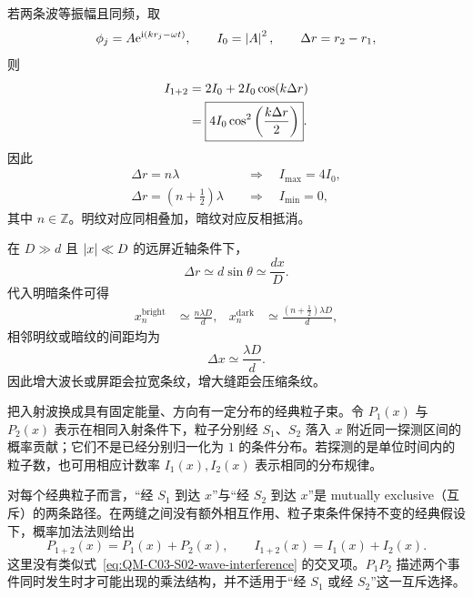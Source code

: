 若两条波等振幅且同频，取
\begin{equation}
  \phi_j=A\mathrm{e}^{\mathrm{i}(kr_j-\omega t)},
  \qquad
  I_0=\left|A\right|^2,
  \qquad
  \Delta r=r_2-r_1,
  \label{eq:QM-C03-S02-equal-amplitude-waves}
\end{equation}
则
\begin{align}
  I_{1+2}
  &=2I_0+2I_0\cos(k\Delta r) \notag\\
  &=\boxed{4I_0\cos^2\left(\frac{k\Delta r}{2}\right)}.
  \label{eq:QM-C03-S02-interference-intensity}
\end{align}
因此
\begin{align}
  \Delta r=n\lambda
  &\quad\Longrightarrow\quad
  I_{\max}=4I_0,
  \label{eq:QM-C03-S02-bright-condition}\\
  \Delta r=\left(n+\frac12\right)\lambda
  &\quad\Longrightarrow\quad
  I_{\min}=0,
  \label{eq:QM-C03-S02-dark-condition}
\end{align}
其中 $n\in\mathbb Z$。明纹对应同相叠加，暗纹对应反相抵消。

在 $D\gg d$ 且 $\left|x\right|\ll D$ 的远屏近轴条件下，
\begin{equation}
  \Delta r\simeq d\sin\theta\simeq\frac{dx}{D}.
  \label{eq:QM-C03-S02-path-difference-approximation}
\end{equation}
代入明暗条件可得
\begin{align}
  x_n^{\mathrm{bright}}
  &\simeq \frac{n\lambda D}{d},
  &
  x_n^{\mathrm{dark}}
  &\simeq \frac{(n+\tfrac12)\lambda D}{d},
  \label{eq:QM-C03-S02-fringe-positions}
\end{align}
相邻明纹或暗纹的间距均为
\begin{equation}
  \boxed{\Delta x\simeq\frac{\lambda D}{d}}.
  \label{eq:QM-C03-S02-fringe-spacing}
\end{equation}
因此增大波长或屏距会拉宽条纹，增大缝距会压缩条纹。


把入射波换成具有固定能量、方向有一定分布的经典粒子束。令 $P_1(x)$ 与 $P_2(x)$ 表示在相同入射条件下，粒子分别经 $S_1$、$S_2$ 落入 $x$ 附近同一探测区间的概率贡献；它们不是已经分别归一化为 $1$ 的条件分布。若探测的是单位时间内的粒子数，也可用相应计数率 $I_1(x),I_2(x)$ 表示相同的分布规律。

对每个经典粒子而言，“经 $S_1$ 到达 $x$”与“经 $S_2$ 到达 $x$”是 mutually exclusive（互斥）的两条路径。在两缝之间没有额外相互作用、粒子束条件保持不变的经典假设下，概率加法法则给出
\begin{equation}
  \boxed{P_{1+2}(x)=P_1(x)+P_2(x)},
  \qquad
  \boxed{I_{1+2}(x)=I_1(x)+I_2(x)}.
  \label{eq:QM-C03-S02-classical-particle-addition}
\end{equation}
这里没有类似式~\eqref{eq:QM-C03-S02-wave-interference} 的交叉项。$P_1P_2$ 描述两个事件同时发生时才可能出现的乘法结构，并不适用于“经 $S_1$ 或经 $S_2$”这一互斥选择。

